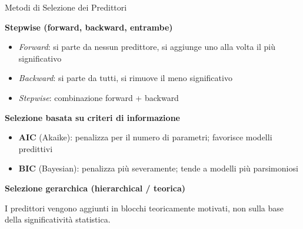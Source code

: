 \documentclass[
  ignorenonframetext,
]{beamer}
\begin{document}
\begin{frame}{Metodi di Selezione dei Predittori}
\label{metodi-di-selezione-dei-predittori}
\small

\textbf{Stepwise (forward, backward, entrambe)}

\begin{itemize}\footnotesize
\item \emph{Forward}: si parte da nessun predittore, si aggiunge uno alla volta il più significativo
\item \emph{Backward}: si parte da tutti, si rimuove il meno significativo
\item \emph{Stepwise}: combinazione forward + backward
\end{itemize}

\vspace{0.3em}

\textbf{Selezione basata su criteri di informazione}

\begin{itemize}\footnotesize
\item \textbf{AIC} (Akaike): penalizza per il numero di parametri; favorisce modelli predittivi
\item \textbf{BIC} (Bayesian): penalizza più severamente; tende a modelli più parsimoniosi
\end{itemize}

\vspace{0.3em}

\textbf{Selezione gerarchica (hierarchical / teorica)}

I predittori vengono aggiunti in blocchi teoricamente motivati, non
sulla base della significatività statistica.
\end{frame}
\end{document}
